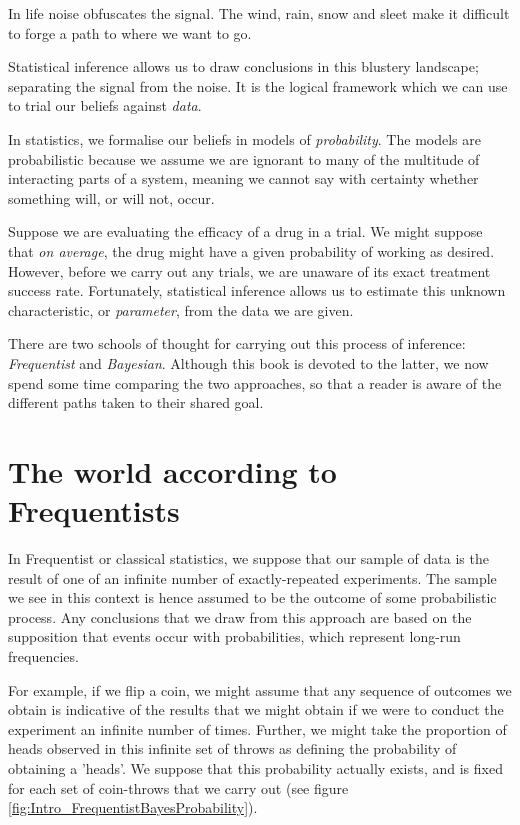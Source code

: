 \documentclass[11pt,fullpage]{book}
\begin{document}
In life noise obfuscates the signal. The wind, rain, snow and sleet make it difficult to forge a path to where we want to go.

Statistical inference allows us to draw conclusions in this blustery landscape; separating the signal from the noise. It is the logical framework which we can use to trial our beliefs against \textit{data}. 

In statistics, we formalise our beliefs in models of \textit{probability}. The models are probabilistic because we assume we are ignorant to many of the multitude of interacting parts of a system, meaning we cannot say with certainty whether something will, or will not, occur.

Suppose we are evaluating the efficacy of a drug in a trial. We might suppose that \textit{on average}, the drug might have a given probability of working as desired. However, before we carry out any trials, we are unaware of its exact treatment success rate. Fortunately, statistical inference allows us to estimate this unknown characteristic, or \textit{parameter}, from the data we are given. 

There are two schools of thought for carrying out this process of inference: \textit{Frequentist} and \textit{Bayesian}. Although this book is devoted to the latter, we now spend some time comparing the two approaches, so that a reader is aware of the different paths taken to their shared goal.

\section{The world according to Frequentists}\label{sec:Intro_FrequentistsWorld}
In Frequentist or classical statistics, we suppose that our sample of data is the result of one of an infinite number of exactly-repeated experiments. The sample we see in this context is hence assumed to be the outcome of some probabilistic process. Any conclusions that we draw from this approach are based on the supposition that events occur with probabilities, which represent long-run frequencies. 

For example, if we flip a coin, we might assume that any sequence of outcomes we obtain is indicative of the results that we might obtain if we were to conduct the experiment an infinite number of times. Further, we might take the proportion of heads observed in this infinite set of throws as defining the probability of obtaining a 'heads'. We suppose that this probability actually exists, and is fixed for each set of coin-throws that we carry out (see figure \ref{fig:Intro_FrequentistBayesProbability}).
\end{document}
